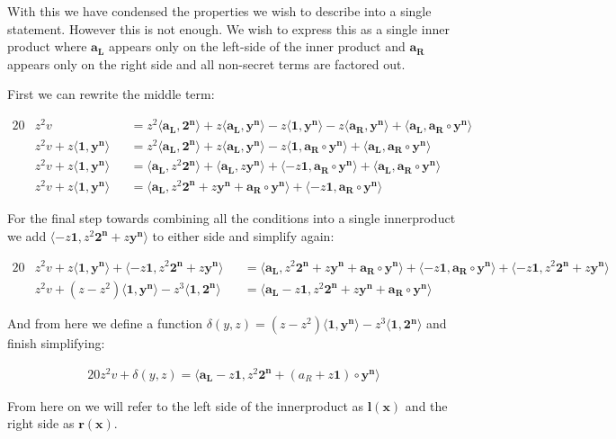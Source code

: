 \documentclass{article}
\newcommand{\eq}[1]{\begin{alignat*}{20}#1\end{alignat*}}
\renewcommand{\vec}[1]{\boldsymbol{#1}}
\newcommand{\vecran}[1]{\mathbf{#1}}
\newcommand{\dotp}[2]{\langle #1, #2 \rangle}
\begin{document}
With this we have condensed the properties we wish to describe into a single statement. However this is not enough. We wish to express this as a single inner product where $\vec{a_L}$ appears only on the left-side of the inner product and $\vec{a_R}$ appears only on the right side and all non-secret terms are factored out. 

First we can rewrite the middle term:

\eq{	
	&z^2v &&= 
	z^2\dotp{\vec{a_L}}{\vec{2^n}} +
	z\dotp{\vec{a_L}}{\vecran{y^n}} -
	z\dotp{\vec{1}}{\vecran{y^n}} -
	z\dotp{\vec{a_R}}{\vecran{y^n}} +
	\dotp{\vec{a_L}}{\vec{a_R}\circ \vecran{y^n}} \\
	&z^2v + z\dotp{\vec{1}}{\vecran{y^n}} 
	&&= z^2\dotp{\vec{a_L}}{\vec{2^n}} +
	z\dotp{\vec{a_L}}{\vecran{y^n}} -
	z\dotp{\vec{1}}{\vec{a_R}\circ\vecran{y^n}} +
	\dotp{\vec{a_L}}{\vec{a_R}\circ \vecran{y^n}} \\
	&z^2v + z\dotp{\vec{1}}{\vecran{y^n}} 
	&&= \dotp{\vec{a_L}}{z^2\vec{2^n}} +
	\dotp{\vec{a_L}}{z\vecran{y^n}} +
	\dotp{-z\vec{1}}{\vec{a_R}\circ\vecran{y^n}} +
	\dotp{\vec{a_L}}{\vec{a_R}\circ \vecran{y^n}} \\
	&z^2v + z\dotp{\vec{1}}{\vecran{y^n}} 
	&&= \dotp{\vec{a_L}}{z^2\vec{2^n} + z\vecran{y^n} + \vec{a_R}\circ \vecran{y^n}} +
	\dotp{-z\vec{1}}{\vec{a_R}\circ\vecran{y^n}}
}

For the final step towards combining all the conditions into a single innerproduct we add $\dotp{-z\vec{1}}{z^2\vec{2^n} + z\vecran{y^n}}$ to either side and simplify again:

\eq{
	&z^2v + z\dotp{\vec{1}}{\vecran{y^n}} + \dotp{-z\vec{1}}{z^2\vec{2^n} + z\vecran{y^n}}
	&&= \dotp{\vec{a_L}}{z^2\vec{2^n} + z\vecran{y^n} + \vec{a_R}\circ \vecran{y^n}} +
	\dotp{-z\vec{1}}{\vec{a_R}\circ\vecran{y^n}} + \dotp{-z\vec{1}}{z^2\vec{2^n} + z\vecran{y^n}} \\
	&z^2v + (z - z^2)\dotp{\vec{1}}{\vecran{y^n}} - z^3\dotp{\vec{1}}{\vec{2^n}} &&= \dotp{\vec{a_L}- z\vec{1}}{z^2\vec{2^n} + z\vecran{y^n} + \vec{a_R}\circ \vecran{y^n}}
}

And from here we define a function $\delta(y,z) = (z - z^2)\dotp{\vec{1}}{\vecran{y^n}} - z^3\dotp{\vec{1}}{\vec{2^n}}$ and finish simplifying:

\eq{
	z^2v + \delta(y,z) = \dotp{\vec{a_L}- z\vec{1}}{z^2\vec{2^n} + (a_R + z\vec{1})\circ\vecran{y^n}}
}

From here on we will refer to the left side of the innerproduct as $\vec{l(x)}$ and the right side as $\vec{r(x)}$.
\end{document}
